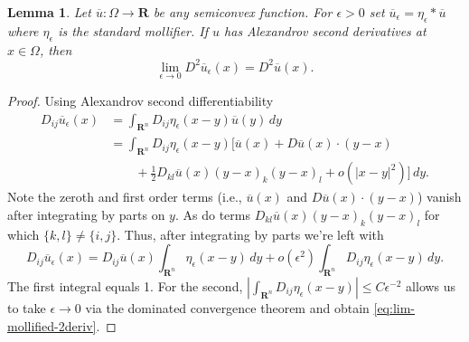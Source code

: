 \documentclass[12pt]{amsart}
\newtheorem{lem}[thm]{Lemma}
\theoremstyle{definition}
\theoremstyle{remark}
\begin{document}
\begin{lem}\label{lem:lim-mollified-2deriv}
  Let $\overline{u}:\Omega \rightarrow \mathbf{R}$ be any semiconvex function. For $\epsilon > 0$ set $\overline{u}_\epsilon = \eta_\epsilon \ast \overline{u}$ where $\eta_\epsilon$ is the standard mollifier. If $u$ has Alexandrov second derivatives at $x \in \Omega$, then
  \begin{equation}
    \label{eq:lim-mollified-2deriv}
    \lim_{\epsilon \rightarrow 0} D^2\overline{u}_\epsilon(x) = D^2\overline{u}(x).
  \end{equation}
\end{lem}
\begin{proof}
Using Alexandrov second differentiability
  \begin{align*}
    D_{ij}\overline{u}_{\epsilon}(x) &= \int_{\mathbf{R}^n}D_{ij}\eta_\epsilon(x-y)\overline{u}(y) \, dy\\
                              &= \int_{\mathbf{R}^n}D_{ij}\eta_\epsilon(x-y)\Big[
                                \overline{u}(x) + D\overline{u}(x)\cdot(y-x)\\
    &\quad \quad +\frac{1}{2}D_{kl}\overline{u}(x)(y-x)_{k}(y-x)_{l} + o(|x-y|^2)
                                \Big] \, dy.
  \end{align*}
Note the zeroth and first order terms (i.e.,  $\overline{u}(x)$ and $D\overline{u}(x)\cdot(y-x)$) vanish after integrating by parts on $y$. As do terms $D_{kl}\overline{u}(x)(y-x)_{k}(y-x)_{l}$ for which $\{k,l\} \neq \{i,j\}$. Thus, after integrating by parts we're left with
  \[     D_{ij}\overline{u}_{\epsilon}(x)= D_{ij}\overline{u}(x)\int_{\mathbf{R}^n}\eta_\epsilon(x-y)\, dy + o(\epsilon^2)\int_{\mathbf{R}^{n}} D_{ij}\eta_\epsilon(x-y)\, dy.\]
  The first integral equals 1. For the second, $| \int_{\mathbf{R}^{n}} D_{ij}\eta_\epsilon(x-y)| \leq C\epsilon^{-2}$ allows us to take $\epsilon \rightarrow0$ via the dominated convergence theorem and obtain \eqref{eq:lim-mollified-2deriv}.
\end{proof}
\end{document}
